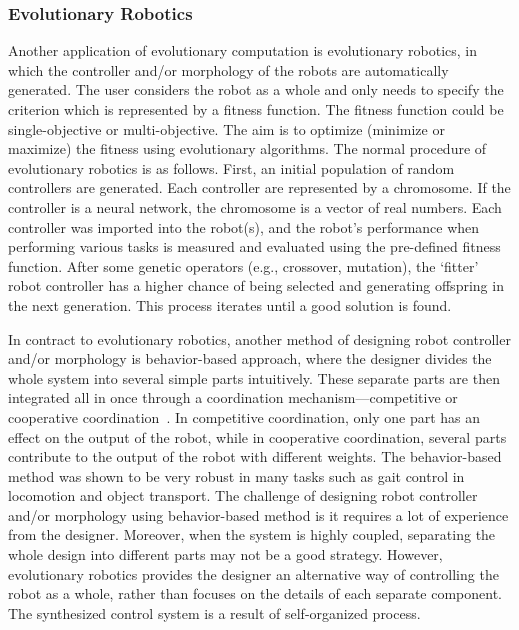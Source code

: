 \begin{itemize}
\end{itemize}

\subsubsection{Evolutionary Robotics}\label{sec:evolutionary_robotics}

Another application of evolutionary computation is evolutionary robotics, in which the controller and/or morphology of the robots are automatically generated. The user considers the robot as a whole and only needs to specify the criterion which is represented by a fitness function. The fitness function could be single-objective or multi-objective. The aim is to optimize (minimize or maximize) the fitness using evolutionary algorithms. The normal procedure of evolutionary robotics is as follows. First, an initial population of random controllers are generated. Each controller are represented by a chromosome. If the controller is a neural network, the chromosome is a vector of real numbers. Each controller was imported into the robot(s), and the robot's performance when performing various tasks is measured and evaluated using the pre-defined fitness function. After some genetic operators (e.g., crossover, mutation), the `fitter' robot controller has a higher chance of being selected and generating offspring in the next generation. This process iterates until a good solution is found. 

In contract to evolutionary robotics, another method of designing robot controller and/or morphology is behavior-based approach, where the designer divides the whole system into several simple parts intuitively. These separate parts are then integrated all in once through a coordination mechanism---competitive or cooperative coordination~\cite{Brooks1986}. In competitive coordination, only one part has an effect on the output of the robot, while in cooperative coordination, several parts contribute to the output of the robot with different weights. The behavior-based method was shown to be very robust in many tasks such as gait control in locomotion and object transport. The challenge of designing robot controller and/or morphology using behavior-based method is it requires a lot of experience from the designer. Moreover, when the system is highly coupled, separating the whole design into different parts may not be a good strategy. However, evolutionary robotics provides the designer an alternative way of controlling the robot as a whole, rather than focuses on the details of each separate component. The synthesized control system is a result of self-organized process. %

